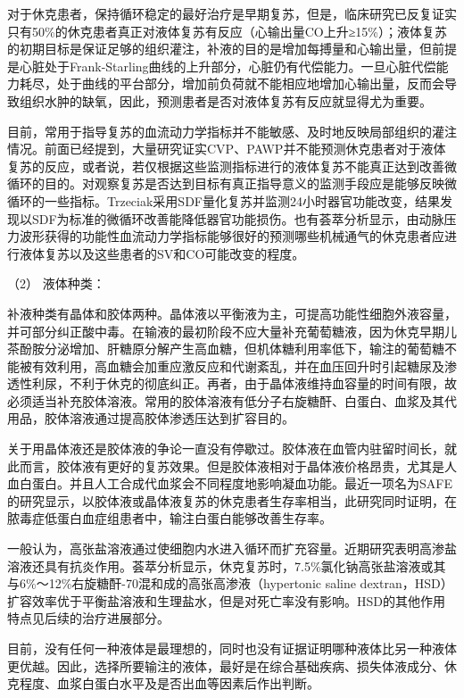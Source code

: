 对于休克患者，保持循环稳定的最好治疗是早期复苏，但是，临床研究已反复证实只有50\%的休克患者真正对液体复苏有反应（心输出量CO上升≥15\%）；液体复苏的初期目标是保证足够的组织灌注，补液的目的是增加每搏量和心输出量，但前提是心脏处于Frank-Starling曲线的上升部分，心脏仍有代偿能力。一旦心脏代偿能力耗尽，处于曲线的平台部分，增加前负荷就不能相应地增加心输出量，反而会导致组织水肿的缺氧，因此，预测患者是否对液体复苏有反应就显得尤为重要。

目前，常用于指导复苏的血流动力学指标并不能敏感、及时地反映局部组织的灌注情况。前面已经提到，大量研究证实CVP、PAWP并不能预测休克患者对于液体复苏的反应，或者说，若仅根据这些监测指标进行的液体复苏不能真正达到改善微循环的目的。对观察复苏是否达到目标有真正指导意义的监测手段应是能够反映微循环的一些指标。Trzeciak采用SDF量化复苏并监测24小时器官功能改变，结果发现以SDF为标准的微循环改善能降低器官功能损伤。也有荟萃分析显示，由动脉压力波形获得的功能性血流动力学指标能够很好的预测哪些机械通气的休克患者应进行液体复苏以及这些患者的SV和CO可能改变的程度。

\hypertarget{text00055.htmlux5cux23CHP2-1-3-2-2-2}{}
（2） 液体种类：

补液种类有晶体和胶体两种。晶体液以平衡液为主，可提高功能性细胞外液容量，并可部分纠正酸中毒。在输液的最初阶段不应大量补充葡萄糖液，因为休克早期儿茶酚胺分泌增加、肝糖原分解产生高血糖，但机体糖利用率低下，输注的葡萄糖不能被有效利用，高血糖会加重应激反应和代谢紊乱，并在血压回升时引起糖尿及渗透性利尿，不利于休克的彻底纠正。再者，由于晶体液维持血容量的时间有限，故必须适当补充胶体溶液。常用的胶体溶液有低分子右旋糖酐、白蛋白、血浆及其代用品，胶体溶液通过提高胶体渗透压达到扩容目的。

关于用晶体液还是胶体液的争论一直没有停歇过。胶体液在血管内驻留时间长，就此而言，胶体液有更好的复苏效果。但是胶体液相对于晶体液价格昂贵，尤其是人血白蛋白。并且人工合成代血浆会不同程度地影响凝血功能。最近一项名为SAFE的研究显示，以胶体液或晶体液复苏的休克患者生存率相当，此研究同时证明，在脓毒症低蛋白血症组患者中，输注白蛋白能够改善生存率。

一般认为，高张盐溶液通过使细胞内水进入循环而扩充容量。近期研究表明高渗盐溶液还具有抗炎作用。荟萃分析显示，休克复苏时，7.5\%氯化钠高张盐溶液或其与6\%～12\%右旋糖酐-70混和成的高张高渗液（hypertonic
saline
dextran，HSD）扩容效率优于平衡盐溶液和生理盐水，但是对死亡率没有影响。HSD的其他作用特点见后续的治疗进展部分。

目前，没有任何一种液体是最理想的，同时也没有证据证明哪种液体比另一种液体更优越。因此，选择所要输注的液体，最好是在综合基础疾病、损失体液成分、休克程度、血浆白蛋白水平及是否出血等因素后作出判断。

